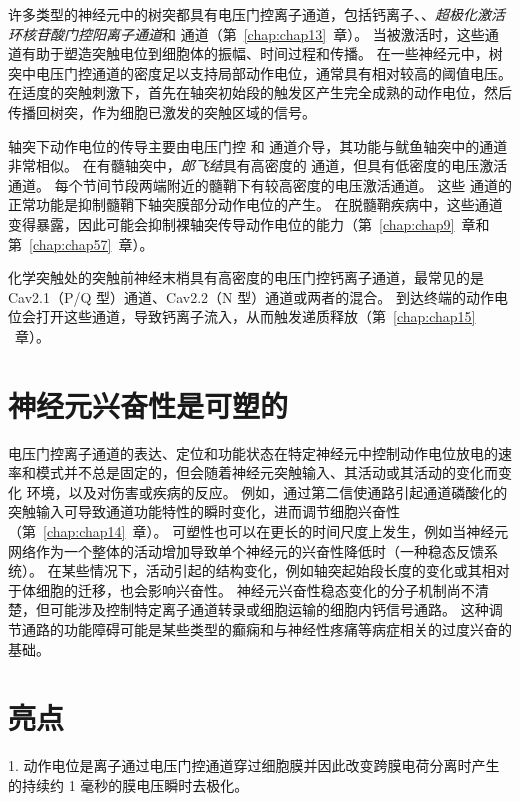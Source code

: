 许多类型的神经元中的树突都具有电压门控离子通道，包括钙离子、、\textit{超极化激活环核苷酸门控阳离子通道}和  通道（第~\ref{chap:chap13}~章）。
当被激活时，这些通道有助于塑造突触电位到细胞体的振幅、时间过程和传播。
在一些神经元中，树突中电压门控通道的密度足以支持局部动作电位，通常具有相对较高的阈值电压。
在适度的突触刺激下，首先在轴突初始段的触发区产生完全成熟的动作电位，然后传播回树突，作为细胞已激发的突触区域的信号。


轴突下动作电位的传导主要由电压门控  和  通道介导，其功能与鱿鱼轴突中的通道非常相似。
在有髓轴突中，\textit{郎飞结}具有高密度的  通道，但具有低密度的电压激活  通道。
每个节间节段两端附近的髓鞘下有较高密度的电压激活通道。
这些  通道的正常功能是抑制髓鞘下轴突膜部分动作电位的产生。
在脱髓鞘疾病中，这些通道变得暴露，因此可能会抑制裸轴突传导动作电位的能力（第~\ref{chap:chap9}~章和第~\ref{chap:chap57}~章）。


化学突触处的突触前神经末梢具有高密度的电压门控钙离子通道，最常见的是 Cav2.1（P/Q 型）通道、Cav2.2（N 型）通道或两者的混合。
到达终端的动作电位会打开这些通道，导致钙离子流入，从而触发递质释放（第~\ref{chap:chap15} ~章）。



\section{神经元兴奋性是可塑的}

电压门控离子通道的表达、定位和功能状态在特定神经元中控制动作电位放电的速率和模式并不总是固定的，但会随着神经元突触输入、其活动或其活动的变化而变化 环境，以及对伤害或疾病的反应。
例如，通过第二信使通路引起通道磷酸化的突触输入可导致通道功能特性的瞬时变化，进而调节细胞兴奋性（第~\ref{chap:chap14}~章）。
可塑性也可以在更长的时间尺度上发生，例如当神经元网络作为一个整体的活动增加导致单个神经元的兴奋性降低时（一种稳态反馈系统）。
在某些情况下，活动引起的结构变化，例如轴突起始段长度的变化或其相对于体细胞的迁移，也会影响兴奋性。
神经元兴奋性稳态变化的分子机制尚不清楚，但可能涉及控制特定离子通道转录或细胞运输的细胞内钙信号通路。 
这种调节通路的功能障碍可能是某些类型的癫痫和与神经性疼痛等病症相关的过度兴奋的基础。




\section{亮点}

1. 动作电位是离子通过电压门控通道穿过细胞膜并因此改变跨膜电荷分离时产生的持续约 1 毫秒的膜电压瞬时去极化。


